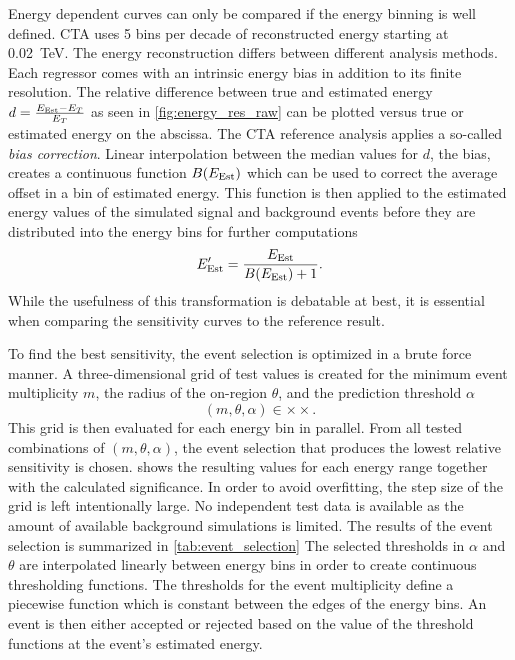 Energy dependent curves can only be compared if the energy binning is well defined.
CTA uses 5 bins per decade of reconstructed energy starting at \SI{0.02}{TeV}. 
The energy reconstruction differs between different analysis methods. 
Each regressor comes with an intrinsic energy bias in addition to its finite resolution.
The relative difference between true and estimated energy $d = \frac{E_\text{Est} - E_T}{E_T}$ as seen in \cref{fig:energy_res_raw} can be 
plotted versus true or estimated energy on the abscissa.
The CTA reference analysis applies a so-called \emph{bias correction}.
Linear interpolation between the median values for $d$, the bias, creates a continuous function $B(E_\text{Est})$ which can be used to correct
the average offset in a bin of estimated energy. 
This function is then applied to the estimated energy values of the simulated signal and background events before they are distributed into the
energy bins for further computations
\begin{equation*}
    E_\text{Est}' = \frac{E_\text{Est}}{B(E_\text{Est}) + 1}.
\end{equation*}
While the usefulness of this transformation is debatable at best, it is essential when comparing the sensitivity
curves to the reference result. 

To find the best sensitivity, the event selection is optimized in a brute force manner. 
A three-dimensional grid of test values is created for the minimum event multiplicity $m$, the radius of the on-region $\theta$, and 
the prediction threshold $\alpha$
\begin{equation*}
    (m, \theta, \alpha) \in  \times  \times .
\end{equation*}
This grid is then evaluated for each energy bin in parallel.
From all tested combinations of $(m, \theta, \alpha)$, the event selection that produces the lowest relative sensitivity is chosen.
 shows the resulting values for each energy range together with
the calculated \lima significance. 
In order to avoid overfitting, the step size of the grid is left intentionally large.
No independent test data is available as the amount of available background simulations is limited.
The results of the event selection is summarized in \cref{tab:event_selection}
The selected thresholds in $\alpha$ and $\theta$ are interpolated linearly between energy
bins in order to create continuous thresholding functions.
The thresholds for the event multiplicity
define a piecewise function which is constant between the edges of the energy bins. 
An event is then either accepted or rejected based on the value of the threshold functions at the event's estimated energy.


